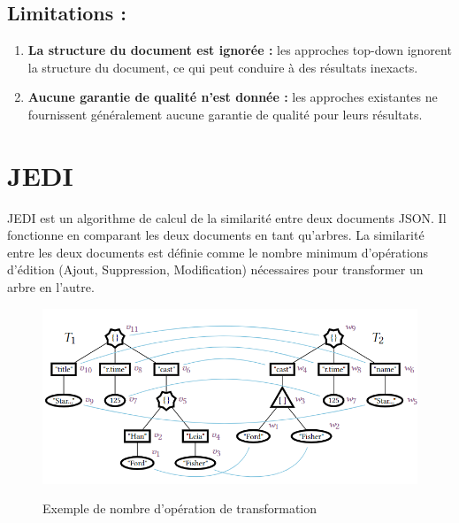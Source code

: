         \subsection{Limitations :}
            \begin{enumerate}
                \item \textbf{La structure du document est ignorée :} les approches top-down ignorent la structure du document, ce qui peut conduire à des résultats inexacts.
                \item \textbf{Aucune garantie de qualité n'est donnée :} les approches existantes ne fournissent généralement aucune garantie de qualité pour leurs résultats.
            \end{enumerate}

    \section{JEDI}
        JEDI \cite{JEDI} est un algorithme de calcul de la similarité entre deux documents JSON. Il fonctionne en comparant les deux documents en tant qu'arbres. La similarité entre les deux documents 
        est définie comme le nombre minimum d'opérations d'édition (Ajout, Suppression, Modification) nécessaires pour transformer un arbre en l'autre.
        \begin{figure}[H]
            \centering
            \includegraphics[scale=0.6]{Photos/Tree.png}
            \caption{Exemple de nombre d'opération de transformation}
            \label{fig:tree}
            \cite{JEDI}

        \end{figure}
